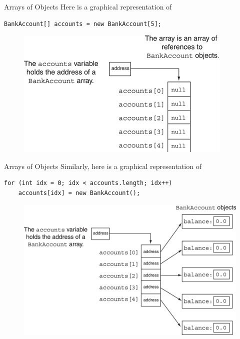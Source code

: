 \documentclass[11pt]{beamer}
\begin{document}
\begin{frame}[fragile]{Arrays of Objects}
Here is a graphical representation of
\begin{lstlisting}
BankAccount[] accounts = new BankAccount[5];
\end{lstlisting}
    \noindent 
    \begin{figure}[H]
    \centering
    \includegraphics[scale=0.8]{Images/chapter07_section06_fig16.png}
    \end{figure}   
\end{frame}

\begin{frame}[fragile]{Arrays of Objects}
Similarly, here is a graphical representation of
\begin{lstlisting}
for (int idx = 0; idx < accounts.length; idx++)
    accounts[idx] = new BankAccount();
\end{lstlisting}
    \noindent 
    \begin{figure}[H]
    \centering
    \includegraphics[scale=0.6]{Images/chapter07_section06_fig17.png}
    \end{figure}   
\end{frame}
\end{document}
